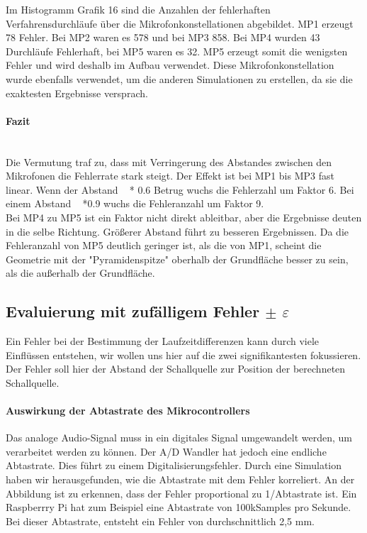 Im Histogramm Grafik 16 sind die Anzahlen der fehlerhaften Verfahrensdurchläufe über die Mikrofonkonstellationen abgebildet. MP1 erzeugt 78 Fehler. Bei MP2 waren es 578 und bei MP3 858. Bei MP4 wurden 43 Durchläufe Fehlerhaft, bei MP5 waren es 32. MP5 erzeugt somit die wenigsten Fehler und wird deshalb im Aufbau verwendet. Diese Mikrofonkonstellation wurde ebenfalls verwendet, um die anderen Simulationen zu erstellen, da sie die exaktesten Ergebnisse versprach.
\paragraph{Fazit}\ \\
Die Vermutung traf zu, dass mit Verringerung des Abstandes zwischen den Mikrofonen die Fehlerrate stark steigt. Der Effekt ist bei MP1 bis MP3 fast linear. Wenn der Abstand ~ * 0.6 Betrug wuchs die Fehlerzahl um Faktor 6. Bei einem Abstand ~ *0.9 wuchs die Fehleranzahl um Faktor 9. \\
Bei MP4 zu MP5 ist ein Faktor nicht direkt ableitbar, aber die Ergebnisse deuten in die selbe Richtung. Größerer Abstand führt zu besseren Ergebnissen.
Da die Fehleranzahl von MP5 deutlich geringer ist, als die von MP1, scheint die Geometrie mit der "Pyramidenspitze" oberhalb der Grundfläche besser zu sein, als die außerhalb der Grundfläche.


\subsection{Evaluierung mit zufälligem Fehler $\pm$ $\varepsilon$}
Ein Fehler bei der Bestimmung der Laufzeitdifferenzen kann durch viele Einflüssen entstehen, wir wollen uns hier auf die zwei signifikantesten fokussieren. Der Fehler soll hier der Abstand der Schallquelle zur Position der berechneten Schallquelle.
\paragraph{Auswirkung der Abtastrate des Mikrocontrollers}
Das analoge Audio-Signal muss in ein digitales Signal umgewandelt werden, um verarbeitet werden zu können. Der A/D Wandler hat jedoch eine endliche Abtastrate. Dies führt zu einem Digitalisierungsfehler. Durch eine Simulation haben wir herausgefunden, wie die Abtastrate mit dem Fehler korreliert. An der Abbildung ist zu erkennen, dass der Fehler proportional zu 1/Abtastrate ist. Ein Raspberrry Pi hat zum Beispiel eine Abtastrate von 100kSamples pro Sekunde. Bei dieser Abtastrate, entsteht ein Fehler von durchschnittlich 2,5 mm.

